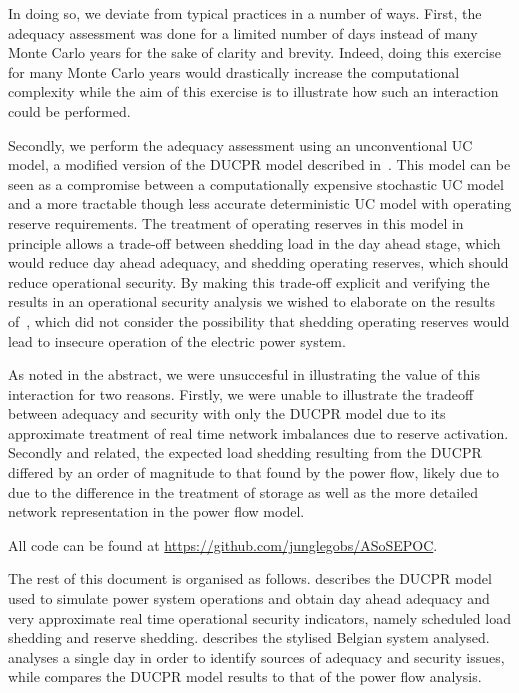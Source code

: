 \documentclass[number,times]{elsarticle}
\begin{document}
In doing so, we deviate from typical practices in a number of ways. First, the adequacy assessment was done for a limited number of days instead of many Monte Carlo years for the sake of clarity and brevity. Indeed, doing this exercise for many Monte Carlo years would drastically increase the computational complexity while the aim of this exercise is to illustrate how such an interaction could be performed.

Secondly, we perform the adequacy assessment using an unconventional \ac{UC} model, a modified version of the \ac{DUCPR} model described in~\cite{Bruninx2017}. This model can be seen as a compromise between a computationally expensive stochastic \ac{UC} model and a more tractable though less accurate deterministic \ac{UC} model with operating reserve requirements. The treatment of operating reserves in this model in principle allows a trade-off between shedding load in the day ahead stage, which would reduce day ahead adequacy, and shedding operating reserves, which should reduce operational security. By making this trade-off explicit and verifying the results in an operational security analysis we wished to elaborate on the results of~\cite{Hermans2018}, which did not consider the possibility that shedding operating reserves would lead to insecure operation of the electric power system.

As noted in the abstract, we were unsuccesful in illustrating the value of this interaction for two reasons. Firstly, we were unable to illustrate the tradeoff between adequacy and security with only the \ac{DUCPR} model due to its approximate treatment of real time network imbalances due to reserve activation. Secondly and related, the expected load shedding resulting from the \ac{DUCPR} differed by an order of magnitude to that found by the power flow, likely due to due to the difference in the treatment of storage as well as the more detailed network representation in the power flow model.

All code can be found at \href{https://github.com/junglegobs/ASoSEPOC}{https://github.com/junglegobs/ASoSEPOC}.

The rest of this document is organised as follows.  describes the \ac{DUCPR} model used to simulate power system operations and obtain day ahead adequacy and very approximate real time operational security indicators, namely scheduled load shedding and reserve shedding.  describes the stylised Belgian system analysed.  analyses a single day in order to identify sources of adequacy and security issues, while  compares the \ac{DUCPR} model results to that of the power flow analysis.
\end{document}
